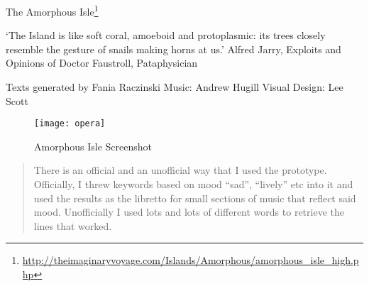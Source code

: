 The Amorphous Isle\footnote{\url{http://theimaginaryvoyage.com/Islands/Amorphous/amorphous_isle_high.php}}

`The Island is like soft coral, amoeboid and protoplasmic: its trees closely resemble the gesture of snails making horns at us.'
Alfred Jarry, Exploits and Opinions of Doctor Faustroll, Pataphysician


Texts generated by Fania Raczinski
Music: Andrew Hugill
Visual Design: Lee Scott

\begin{figure}[h!]
  \centering
  \texttt{[image: opera]}
\caption[Amorphous Isle Screenshot]{Amorphous Isle Screenshot}
\label{fig:opera}
\end{figure}

\begin{quotation}
  There is an official and an unofficial way that I used the prototype. Officially, I threw keywords based on mood ``sad'', ``lively'' etc into it and used the results as the libretto for small sections of music that reflect said mood. Unofficially I used lots and lots of different words to retrieve the lines that worked. 
\end{quotation}

\spirals

